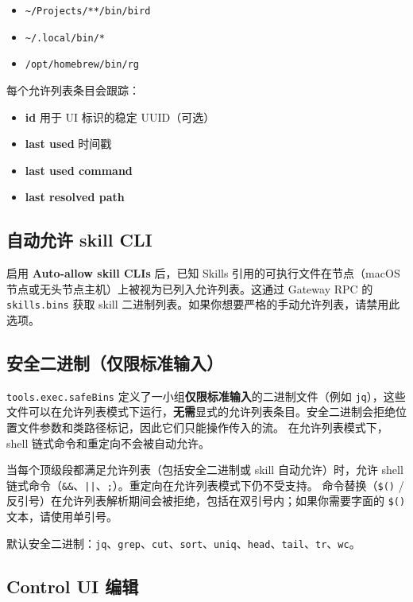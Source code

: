 \begin{itemize}
  \item \texttt{\textasciitilde{}/Projects/**/bin/bird}
  \item \texttt{\textasciitilde{}/.local/bin/*}
  \item \texttt{/opt/homebrew/bin/rg}
\end{itemize}


每个允许列表条目会跟踪：

\begin{itemize}
  \item \textbf{id} 用于 UI 标识的稳定 UUID（可选）
  \item \textbf{last used} 时间戳
  \item \textbf{last used command}
  \item \textbf{last resolved path}
\end{itemize}


\subsection{自动允许 skill CLI}


启用 \textbf{Auto-allow skill CLIs} 后，已知 Skills 引用的可执行文件在节点（macOS 节点或无头节点主机）上被视为已列入允许列表。这通过 Gateway RPC 的 \texttt{skills.bins} 获取 skill 二进制列表。如果你想要严格的手动允许列表，请禁用此选项。

\subsection{安全二进制（仅限标准输入）}


\texttt{tools.exec.safeBins} 定义了一小组\textbf{仅限标准输入}的二进制文件（例如 \texttt{jq}），这些文件可以在允许列表模式下运行，\textbf{无需}显式的允许列表条目。安全二进制会拒绝位置文件参数和类路径标记，因此它们只能操作传入的流。
在允许列表模式下，shell 链式命令和重定向不会被自动允许。

当每个顶级段都满足允许列表（包括安全二进制或 skill 自动允许）时，允许 shell 链式命令（\texttt{\&\&}、\texttt{||}、\texttt{;}）。重定向在允许列表模式下仍不受支持。
命令替换（\texttt{\$()} / 反引号）在允许列表解析期间会被拒绝，包括在双引号内；如果你需要字面的 \texttt{\$()} 文本，请使用单引号。

默认安全二进制：\texttt{jq}、\texttt{grep}、\texttt{cut}、\texttt{sort}、\texttt{uniq}、\texttt{head}、\texttt{tail}、\texttt{tr}、\texttt{wc}。

\subsection{Control UI 编辑}


